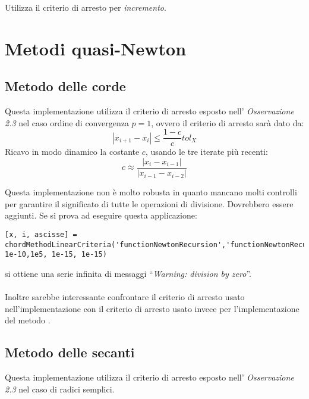 Utilizza il criterio di arresto per \emph{incremento}.


\section{Metodi quasi-Newton}
\subsection{Metodo delle corde}
\label{subsec:chordMethodLinearCriteria}
Questa implementazione utilizza il criterio di arresto esposto nell'
\emph{Osservazione 2.3} nel caso ordine di convergenza $p = 1$, ovvero il
criterio di arresto sar\`a dato da:
\begin{displaymath}
	|x_{i+1} - x_{i}| \leq \frac{1-c}{c}tol_{X}
\end{displaymath}
Ricavo in modo dinamico la costante $c$, usando le tre iterate pi\`u recenti:
\begin{displaymath}
	c \approx \frac{|x_{i} - x_{i-1}|}{|x_{i-1} - x_{i-2}|}
\end{displaymath}

\begin{oss}
Questa implementazione non \`e molto robusta in quanto mancano molti controlli
per garantire il significato di tutte le operazioni di divisione. Dovrebbero
essere aggiunti. Se si prova ad eseguire questa applicazione:
\begin{lstlisting}
[x, i, ascisse] =
chordMethodLinearCriteria('functionNewtonRecursion','functionNewtonRecursionDerivative',1-1e-10,1e5, 1e-15, 1e-15)
\end{lstlisting}
si ottiene una serie infinita di messaggi ``\emph{Warning: division by zero}''.
\\\\
Inoltre sarebbe interessante confrontare il criterio di arresto usato
nell'implementazione con il criterio di arresto usato invece per
l'implementazione del metodo .
\end{oss}

\subsection{Metodo delle secanti}
\label{subsec:secantMethod}
Questa implementazione utilizza il criterio di arresto esposto nell'
\emph{Osservazione 2.3} nel caso di radici semplici.

